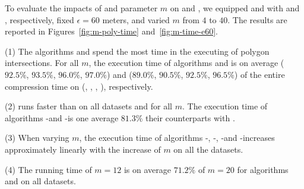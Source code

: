 To evaluate the impacts of \rpia and parameter $m$ on \cist and \cista, we
equipped \cist and \cista with \rpia and \cpia, respectively, fixed $\epsilon =60$ meters, and varied $m$ from $4$ to $40$.
%
The results are reported in Figures~\ref{fig:m-poly-time} and~\ref{fig:m-time-e60}.

\ni(1) The algorithms \cist and \cista spend the most time in the executing of polygon intersections. For all $m$, the execution time of algorithms \cpia and \rpia is on average ($92.5\%$, $93.5\%$, $96.0\%$, $97.0\%$) and ($89.0\%$, $90.5\%$, $92.5\%$, $96.5\%$) of the entire compression time on (\truck, \sercar, \geolife, \pricar), respectively.

\ni(2) \rpia runs faster than \cpia on all datasets and for all $m$. The execution time of algorithms \cist-\rpia and \cista-\rpia is one average $81.3\%$ their counterparts with \cpia.

\ni(3) When varying $m$, the execution time of algorithms \cist-\rpia, \cist-\cpia, \cista-\rpia and \cista-\cpia increases approximately linearly with the increase of $m$ on all the datasets.

\ni(4) The running time of $m=12$ is on average {$71.2\%$} of $m=20$ for algorithms \cist and \cista on all datasets.




